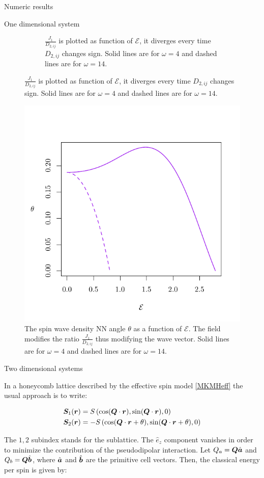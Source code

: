 \begin{section}{Numeric results}
\begin{subsection}{One dimensional system}
\begin{figure}
\begin{subfigure}{.45\textwidth}
  \caption{$\frac{J_{1}}{D_{2,ij}}$ is plotted as function of $\mathcal{E}$, it diverges every time $D_{2,ij}$ changes sign. Solid lines are for $\omega = 4$ and dashed lines are for $\omega = 14$.}
  \label{Fig3.1:ratio}
\end{subfigure}
\label{Fig3.1}
\end{figure}

\begin{figure}
\centering
  \includegraphics[width=0.5\linewidth]{Figures/theta.pdf}
  \caption{The spin wave density NN angle $\theta$ as a function of $\mathcal{E}$. The field modifies the ratio $\frac{J_{1}}{D_{2,ij}}$ thus modifying the wave vector. Solid lines are for $\omega = 4$ and dashed lines are for $\omega = 14$.}
\label{Fig3.2}
\end{figure}

\end{subsection}

\begin{subsection}{Two dimensional systems}
 
In a honeycomb lattice described by the effective spin model \ref{MKMHeff} the usual approach is to write:

\begin{align}
\boldsymbol{S}_1(\boldsymbol{r}) &= S\left( \cos(\boldsymbol{Q}\cdot\boldsymbol{r}), \sin(\boldsymbol{Q}\cdot\boldsymbol{r}), 0 \right) \\
\boldsymbol{S}_2(\boldsymbol{r}) &= -S\left( \cos(\boldsymbol{Q}\cdot\boldsymbol{r} + \theta), \sin(\boldsymbol{Q}\cdot\boldsymbol{r} + \theta), 0 \right)
\end{align}

The $1, 2$ subindex stands for the sublattice. The $\hat{e}_z$ component vanishes in order to minimize the contribution of the pseudodipolar interaction. Let $Q_a = \boldsymbol{Q}\hat{\boldsymbol{a}}$ and $Q_b = \boldsymbol{Q}\hat{\boldsymbol{b}}$, where $\hat{\boldsymbol{a}}$ and $\hat{\boldsymbol{b}}$ are the primitive cell vectors. Then, the classical energy per spin is given by:


\end{subsection}
\end{section}

